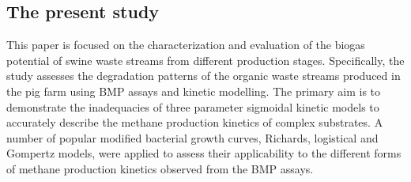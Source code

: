 \subsection{The present study}
This paper is focused on the characterization and evaluation of the biogas potential of swine waste streams from different production stages. Specifically, the study assesses the degradation patterns of the organic waste streams produced in the pig farm using BMP assays and kinetic modelling. The primary aim is to demonstrate the inadequacies of three parameter sigmoidal kinetic models to accurately describe the methane production kinetics of complex substrates. A number of popular modified bacterial growth curves, Richards, logistical and Gompertz models, were applied to assess their applicability to the different forms of methane production kinetics observed from the BMP assays.